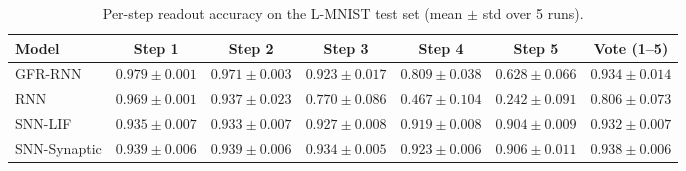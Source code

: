 \begin{table}[t]
    \caption{Per-step readout accuracy on the L-MNIST test set (mean $\pm$ std over 5 runs).}
    \label{tab:per-step-accuracy-test}
    \centering
    \small
    \begin{tabular}{lcccccc}
    \toprule
    \textbf{Model} & \textbf{Step 1} & \textbf{Step 2} & \textbf{Step 3} & \textbf{Step 4} & \textbf{Step 5} & \textbf{Vote (1--5)} \\
    \midrule
    GFR-RNN & $0.979 \pm 0.001$ & $0.971 \pm 0.003$ & $0.923 \pm 0.017$ & $0.809 \pm 0.038$ & $0.628 \pm 0.066$ & $0.934 \pm 0.014$ \\
    RNN & $0.969 \pm 0.001$ & $0.937 \pm 0.023$ & $0.770 \pm 0.086$ & $0.467 \pm 0.104$ & $0.242 \pm 0.091$ & $0.806 \pm 0.073$ \\
    SNN-LIF & $0.935 \pm 0.007$ & $0.933 \pm 0.007$ & $0.927 \pm 0.008$ & $0.919 \pm 0.008$ & $0.904 \pm 0.009$ & $0.932 \pm 0.007$ \\
    SNN-Synaptic & $0.939 \pm 0.006$ & $0.939 \pm 0.006$ & $0.934 \pm 0.005$ & $0.923 \pm 0.006$ & $0.906 \pm 0.011$ & $0.938 \pm 0.006$ \\
    \bottomrule
    \end{tabular}
\end{table}
